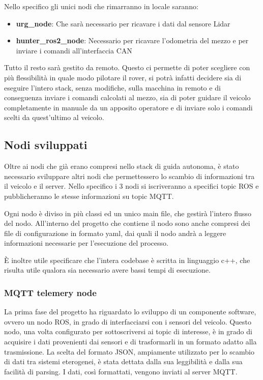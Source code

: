 \noindent Nello specifico gli unici nodi che rimarranno in locale saranno:

\begin{itemize}
  \item \textbf{urg\_node}: Che sarà necessario per ricavare i dati dal sensore Lidar
  \item \textbf{hunter\_ros2\_node}: Necessario per ricavare l'odometria del mezzo e per inviare i comandi all'interfaccia CAN
\end{itemize}

\noindent Tutto il resto sarà gestito da remoto. Questo ci permette di poter scegliere con più flessibilità in quale modo pilotare il rover, si potrà infatti decidere sia di eseguire l'intero stack, senza modifiche, sulla macchina in remoto e di conseguenza inviare i comandi calcolati al mezzo, sia di poter guidare il veicolo completamente in manuale da un apposito operatore e di inviare solo i comandi scelti da quest'ultimo al veicolo.

\subsection{Nodi sviluppati}
Oltre ai nodi che già erano compresi nello stack di guida autonoma, è stato necessario sviluppare altri nodi che permettessero lo scambio di informazioni tra il veicolo e il server. Nello specifico i 3 nodi si iscriveranno a specifici topic ROS e pubblicheranno le stesse informazioni su topic MQTT.

\noindent Ogni nodo è diviso in più classi ed un unico main file, che gestirà l'intero flusso del nodo. All'interno del progetto che contiene il nodo sono anche compresi dei file di configurazione in formato yaml, dai quali il nodo andrà a leggere informazioni necessarie per l'esecuzione del processo.

\noindent È inoltre utile specificare che l'intera codebase è scritta in linguaggio c++, che risulta utile qualora sia necessario avere bassi tempi di esecuzione.

\subsubsection{MQTT telemery node}
La prima fase del progetto ha riguardato lo sviluppo di un componente software, ovvero un nodo ROS, in grado di interfacciarsi con i sensori del veicolo. Questo nodo, una volta configurato per sottoscriversi ai topic di interesse, è in grado di acquisire i dati provenienti dai sensori e di trasformarli in un formato adatto alla trasmissione. La scelta del formato JSON, ampiamente utilizzato per lo scambio di dati tra sistemi eterogenei, è stata dettata dalla sua leggibilità e dalla sua facilità di parsing. I dati, così formattati, vengono inviati al server MQTT.

